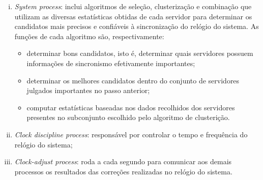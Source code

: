 \begin {enumerate}[i.]
	O \textit{poll process} é responsável, por sua vez, por enviar pacotes aos
	servidores a cada intervalo de \(2^\tau\) segundos. \(\tau\) varia de 3 a 17,
	resultando, assim, em intervalos de 8 segundos a 36 horas. O valor de \(\tau\)
	pode variar durante a execução, sendo modificado pelo algoritmo regulador do
	relógio, que será discutido posteriormente. 
	
	\item \textit{System process}: inclui algoritmos de seleção, clusterização e
	combinação que utilizam as diversas estatísticas obtidas de cada servidor para
	determinar os candidatos mais precisos e confiáveis à sincronização do relógio
	do sistema. As funções de cada algoritmo são, respectivamente:
		
		\begin{itemize}
  		  \renewcommand\labelitemi{--}
  		  \item determinar bons candidatos, isto é, determinar quais servidores
  		  possuem informações de sincronismo efetivamente importantes;
  		  \item determinar os melhores candidatos dentro do conjunto de servidores
  		  julgados importantes no passo anterior;
  		  \item computar estatísticas baseadas nos dados recolhidos dos servidores
  		  presentes no subconjunto escolhido pelo algoritmo de clusterição.
  		\end{itemize}
  	
  	\item \textit{Clock discipline process}: responsável por controlar o tempo e
  	frequência do relógio do sistema;
  	
  	\item \textit{Clock-adjust process}: roda a cada segundo para comunicar aos
  	demais processos os resultados das correções realizadas no relógio do
  	sistema.
  	
\end{enumerate}

